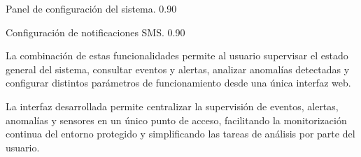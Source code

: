 {Panel de configuración del sistema.}
{0.90}

{Configuración de notificaciones SMS.}
{0.90}

La combinación de estas funcionalidades permite al usuario supervisar el estado general del sistema, consultar eventos y alertas, analizar anomalías detectadas y configurar distintos parámetros de funcionamiento desde una única interfaz web.

La interfaz desarrollada permite centralizar la supervisión de eventos, alertas, anomalías y sensores en un único punto de acceso, facilitando la monitorización continua del entorno protegido y simplificando las tareas de análisis por parte del usuario.



